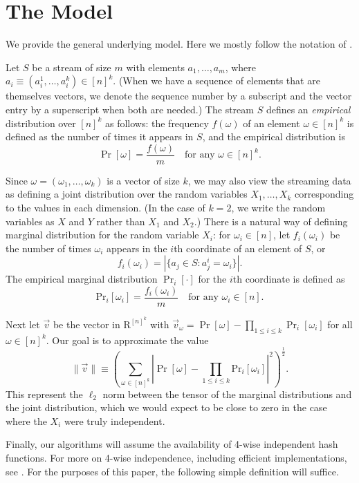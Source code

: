 \def\draft{0}  \documentclass[proceedings]{stacs}
\theoremstyle{plain}\newtheorem{satz}[thm]{Satz}
\theoremstyle{definition}\newtheorem{crucial}[thm]{Crucial Definition}
\begin{document}
\section{The Model}
We provide the general underlying model.  Here we mostly follow the notation of \cite{BO01,IM08}.

Let $S$ be a stream of size $m$ with elements $a_1, \dots, a_m$, where
$a_i \equiv (a^1_i, \dots, a^k_i) \in [n]^k$.
(When we have a sequence of elements that are themselves vectors, we
denote the sequence number by a subscript and the vector entry by a
superscript when both are needed.)
The stream $S$ defines an
\emph{empirical} distribution over $[n]^k$ as follows: the frequency
$f(\omega)$ of an element $\omega \in [n]^k$ is defined as the number
of times it appears in $S$, and the empirical distribution is
$$\Pr[\omega] = \frac{f(\omega)}{m} \quad \mbox{for any $\omega \in [n]^k$.}$$

Since $\omega = (\omega_1, \dots, \omega_k)$ is a vector of size $k$, we
may also view the streaming data as defining a joint distribution over
the random variables $X_1, \dots, X_k$ corresponding to the values in
each dimension. (In the case of $k = 2$, we write the random variables
as $X$ and $Y$ rather than $X_1$ and $X_2$.) There is a natural way of
defining marginal distribution for the random variable $X_i$: for
$\omega_i \in [n]$, let $f_i(\omega_i)$ be the number of times
$\omega_i$ appears in the $i$th coordinate of an element of $S$,
or
$$f_i(\omega_i) = \left|\{a_j \in S: a^i_j = \omega_i\}\right|.$$
The empirical marginal distribution $\Pr_i[\cdot]$  for the $i$th coordinate is defined as
$$\mathrm{Pr}_i[\omega_i] = \frac{f_i(\omega_i)}{m} \quad \mbox{for any $\omega_i \in [n]$.}$$

Next let $\vec v$ be the vector in ${\mathrm R}^{[n]^k}$ with $\vec v_\omega = \Pr[\omega] - \prod_{1 \leq i\leq k}\Pr_i[\omega_i]$ for all $\omega \in [n]^k$. Our goal is to approximate the value
\begin{equation}\label{eqn:alpha}
\|\vec v\| \equiv \left(\sum_{\omega \in [n]^k}\left|\Pr[\omega] - \prod_{1 \leq i \leq k}\mathrm{Pr}_i[\omega_i] \right|^2\right)^{\frac 1 2}.
\end{equation}
This represent the $\ell_2$ norm between the tensor of the marginal distributions and the joint distribution,
which we would expect to be close to zero in the case where the $X_i$ were truly independent.

Finally, our algorithms will assume the availability of 4-wise independent hash functions.
For more on 4-wise independence, including efficient implementations, see \cite{BCH, TZ04}.
For the purposes of this paper, the following simple definition will suffice.
\end{document}
